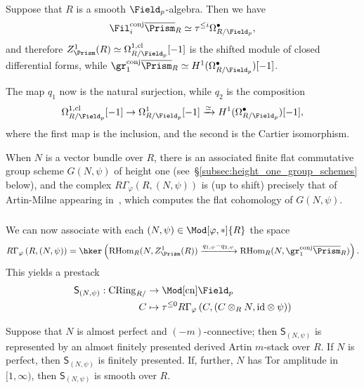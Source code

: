 \documentclass[10pt]{amsart}
\begin{document}
\begin{remark}
\label{rem:zprism_expl}
Suppose that $R$ is a smooth $\Field_p$-algebra. Then we have 
\[
\Fil_i^{\mathrm{conj}}\overline{\Prism}_R\simeq \tau^{\le i}\Omega^\bullet_{R/\Field_p},
\]
and therefore $Z^1_{\Prism}(R) \simeq \Omega^{1,\mathrm{cl}}_{R/\Field_p}[-1]$ is the shifted module of closed differential forms, while $\gr^{\mathrm{conj}}_1\overline{\Prism}_R\simeq H^1(\Omega^\bullet_{R/\Field_p})[-1]$.

The map $q_1$ now is the natural surjection, while $q_2$ is the composition
\[
\Omega^{1,\mathrm{cl}}_{R/\Field_p}[-1]\to \Omega^1_{R/\Field_p}[-1]\xrightarrow{\simeq}H^1(\Omega^\bullet_{R/\Field_p})[-1],
\]
where the first map is the inclusion, and the second is the Cartier isomorphism.

When $N$ is a vector bundle over $R$, there is an associated finite flat commutative group scheme $G(N,\psi)$ of height one (see~\S\ref{subsec:height_one_group_schemes} below), and the complex $R\Gamma_\varphi(R,(N,\psi))$ is (up to shift) precisely that of Artin-Milne appearing in~\cite[Prop. 2.4]{artin_milne}, which computes the flat cohomology of $G(N,\psi)$.
\end{remark}

\subsubsection{}
We can now associate with each $(N,\psi)\in \Mod[\varphi,*]{R}$ the space
\[
R\Gamma_\varphi\left(R,(N,\psi)\right) = \hker\left(\mathrm{RHom}_R(N,Z^1_{\Prism}(R))\xrightarrow{q_{1,\psi}-q_{2,\psi}}\mathrm{RHom}_R(N,\gr_1^{\mathrm{conj}}\overline{\Prism}_R)\right).
\]
This yields a prestack
\begin{align*}
\mathsf{S}_{(N,\psi)}:\mathrm{CRing}_{R/}&\to \Mod[\mathrm{cn}]{\Field_p}\\
C&\mapsto \tau^{\leq 0}R\Gamma_\varphi\left(C,(C\otimes_RN, \mathrm{id}\otimes \psi)\right)
\end{align*}

\begin{theorem}
\label{thm:repbility_height_one}
Suppose that $N$ is almost perfect and $(-m)$-connective; then $\mathsf{S}_{(N,\psi)}$ is represented by an almost finitely presented derived Artin $m$-stack over $R$. If $N$ is perfect, then $\mathsf{S}_{(N,\psi)}$ is finitely presented. If, further, $N$ has Tor amplitude in $[1,\infty)$, then $\mathsf{S}_{(N,\psi)}$ is smooth over $R$.
\end{theorem}
\end{document}
